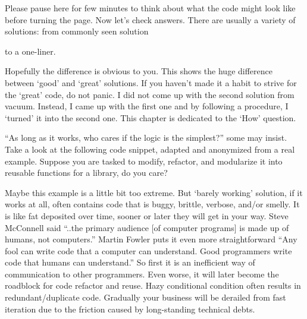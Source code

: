 Please pause here for few minutes to think about what the code might look like before turning the
page.
\clearpage
Now let's check answers.
There are usually a variety of solutions: from commonly seen solution

to a one-liner.

Hopefully the difference is obvious to you.
This shows the huge difference between `good' and `great' solutions.
If you haven't made it a habit to strive for the `great' code, do not panic.
I did not come up with the second solution from vacuum.
Instead, I came up with the first one and by following a procedure, I `turned' it into the second
one.
This chapter is dedicated to the `How' question.


``As long as it works, who cares if the logic is the simplest?'' some may insist.
Take a look at the following code snippet, adapted and anonymized from a real example.
Suppose you are tasked to modify, refactor, and modularize it into reusable functions for a library,
do you care?


Maybe this example is a little bit too extreme.
But `barely working' solution, if it works at all, often contains code that is buggy, brittle,
verbose, and/or smelly.
It is like fat deposited over time, sooner or later they will get in your way.
Steve McConnell said ``..the primary audience [of computer programs] is made up of humans,
not computers\cite{Mcconnell.2004}.''
Martin Fowler puts it even more straightforward
``Any fool can write code that a computer can understand.
Good programmers write code that humans can understand\cite{Fowler1999}.''
So first it is an inefficient way of communication to other programmers.
Even worse, it will later become the roadblock for code refactor and reuse.
Hazy conditional condition often results in redundant/duplicate code.
Gradually your business will be derailed from fast iteration due to the friction caused by
long-standing technical debts.

